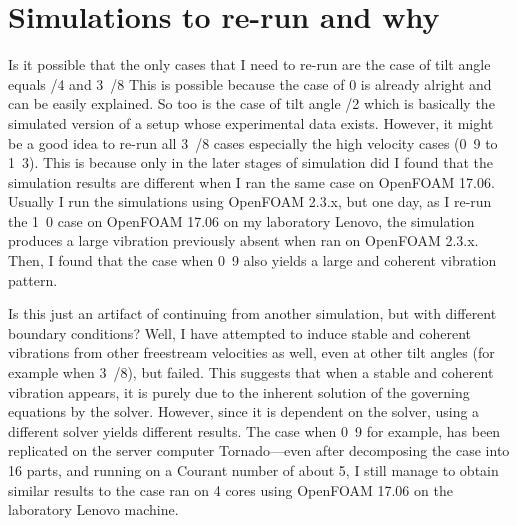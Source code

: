 \documentclass[a4paper]{article}
\begin{document}
\newcommand{\uon}{\unit{0.1}{\metre\per\second}}
\newcommand{\utw}{\unit{0.2}{\metre\per\second}}
\newcommand{\uth}{\unit{0.3}{\metre\per\second}}
\newcommand{\ufo}{\unit{0.4}{\metre\per\second}}
\newcommand{\ufi}{\unit{0.5}{\metre\per\second}}
\newcommand{\usi}{\unit{0.6}{\metre\per\second}}
\newcommand{\use}{\unit{0.7}{\metre\per\second}}
\newcommand{\uei}{\unit{0.8}{\metre\per\second}}
\newcommand{\uni}{\unit{0.9}{\metre\per\second}}
\newcommand{\ute}{\unit{1.0}{\metre\per\second}}
\newcommand{\uel}{\unit{1.1}{\metre\per\second}}
\newcommand{\utv}{\unit{1.2}{\metre\per\second}}
\newcommand{\utt}{\unit{1.3}{\metre\per\second}}

\newcommand{\ptlt}{$\theta_{plate}$}
\newcommand{\rze}{\unit{0}{\radian}}
\newcommand{\ron}{\unit{\pi/8}{\radian}}
\newcommand{\rtw}{\unit{\pi/4}{\radian}}
\newcommand{\rth}{\unit{3\pi/8}{\radian}}
\newcommand{\rfo}{\unit{\pi/2}{\radian}}

\newcommand{\ypl}{$y^{+}$} %
\newcommand{\ured}{$U^{*}$} %

\section*{Simulations to re-run and why}\label{whyRerun}

Is it possible that the only cases that I need to re-run are the case of tilt angle equals \rtw{} and \rth{} This is possible because the case of \rze{} is already alright and can be easily explained. So too is the case of tilt angle \rfo{} which is basically the simulated version of a setup whose experimental data exists. However, it might be a good idea to re-run all \rth{} cases especially the high velocity cases (\uni{} to \utt). This is because only in the later stages of simulation did I found that the simulation results are different when I ran the same case on OpenFOAM 17.06. Usually I run the simulations using OpenFOAM 2.3.x, but one day, as I re-run the \ute{} case on OpenFOAM 17.06 on my laboratory Lenovo, the simulation produces a large vibration previously absent when ran on OpenFOAM 2.3.x. Then, I found that the case when \uni{} also yields a large and coherent vibration pattern.

Is this just an artifact of continuing from another simulation, but with different boundary conditions? Well, I have attempted to induce stable and coherent vibrations from other freestream velocities as well, even at other tilt angles (for example when \rth), but failed. This suggests that when a stable and coherent vibration appears, it is purely due to the inherent solution of the governing equations by the solver. However, since it is dependent on the solver, using a different solver yields different results. The case when \uni{} for example, has been replicated on the server computer Tornado---even after decomposing the case into 16 parts, and running on a Courant number of about 5, I still manage to obtain similar results to the case ran on 4 cores using OpenFOAM 17.06 on the laboratory Lenovo machine.
\end{document}
